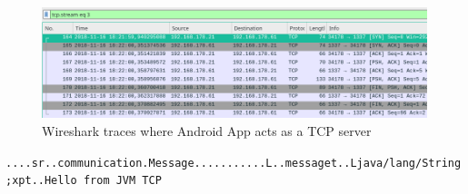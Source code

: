 \begin{figure}[H]
	\includegraphics[width=1\linewidth]{images/task3/subtask2/wireshark/androidServerTCP.png}
	\caption{Wireshark traces where Android App acts as a TCP server}
	\label{fig:wire4}
\end{figure}



\texttt{....sr..communication.Message...........L..messaget..Ljava/lang/String;xpt..Hello from JVM TCP}



